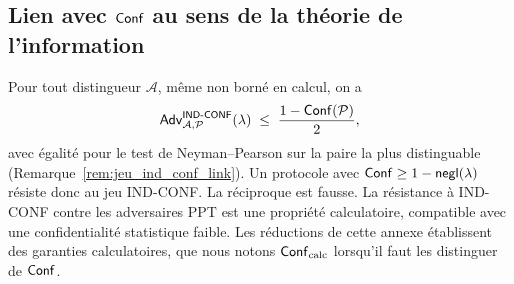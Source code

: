\begin{sloppypar}
\subsection{Lien avec $\mathsf{Conf}$ au sens de la th\'eorie de l'information}

\begin{remark}
\label{rem:ann_ind_conf_link}
Pour tout distingueur $\mathcal{A}$, m\^eme non born\'e en calcul, on a
\begin{equation}
\mathsf{Adv}^{\mathsf{IND\text{-}CONF}}_{\mathcal{A},\mathcal{P}}(\lambda)
\;\leq\; \frac{1 - \mathsf{Conf}(\mathcal{P})}{2},
\end{equation}
avec \'egalit\'e pour le test de Neyman--Pearson sur la paire la plus
distinguable (Remarque~\ref{rem:jeu_ind_conf_link}). Un protocole avec
$\mathsf{Conf} \geq 1 - \mathsf{negl}(\lambda)$ r\'esiste donc au jeu IND-CONF. La r\'eciproque
est fausse. La r\'esistance \`a IND-CONF contre les adversaires PPT est une
propri\'et\'e calculatoire, compatible avec une confidentialit\'e statistique faible.
Les r\'eductions de cette annexe \'etablissent des garanties calculatoires, que
nous notons $\mathsf{Conf}_{\mathrm{calc}}$ lorsqu'il faut les distinguer de $\mathsf{Conf}$.
\end{remark}

\end{sloppypar}


